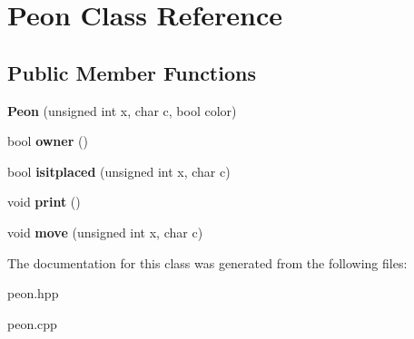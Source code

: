 \hypertarget{classPeon}{\section{Peon Class Reference}
\label{classPeon}
}
\subsection*{Public Member Functions}
\begin{DoxyCompactItemize}
\item 
\hypertarget{classPeon_a22053decb5ad9611c2295fa6afd5e5da}{{\bfseries Peon} (unsigned int x, char c, bool color)}\label{classPeon_a22053decb5ad9611c2295fa6afd5e5da}

\item 
\hypertarget{classPeon_a5680fbfb70e2219f4279d39c6691590a}{bool {\bfseries owner} ()}\label{classPeon_a5680fbfb70e2219f4279d39c6691590a}

\item 
\hypertarget{classPeon_aaecec5972ed61462e9d37d4200435cb2}{bool {\bfseries isitplaced} (unsigned int x, char c)}\label{classPeon_aaecec5972ed61462e9d37d4200435cb2}

\item 
\hypertarget{classPeon_a7ab58cb0f1dc489cd8bd9fb72e06c86d}{void {\bfseries print} ()}\label{classPeon_a7ab58cb0f1dc489cd8bd9fb72e06c86d}

\item 
\hypertarget{classPeon_a33eaafd06b947623b7673dde789ab7a7}{void {\bfseries move} (unsigned int x, char c)}\label{classPeon_a33eaafd06b947623b7673dde789ab7a7}

\end{DoxyCompactItemize}


The documentation for this class was generated from the following files\-:\begin{DoxyCompactItemize}
\item 
peon.\-hpp\item 
peon.\-cpp\end{DoxyCompactItemize}
